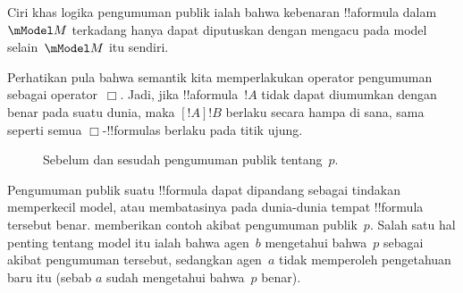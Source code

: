 \documentclass[../../../include/open-logic-section]{subfiles}
\begin{document}
Ciri khas logika pengumuman publik ialah bahwa kebenaran !!a{formula}
dalam~$\mModel M$ terkadang hanya dapat diputuskan dengan mengacu pada model
selain~$\mModel M$ itu sendiri.

Perhatikan pula bahwa semantik kita memperlakukan operator pengumuman sebagai
operator~$\Box$. Jadi, jika !!a{formula}~$!A$ tidak dapat diumumkan dengan
benar pada suatu dunia, maka $[!A]!B$ berlaku secara hampa di sana, sama
seperti semua $\Box$-!!{formula}s berlaku pada titik ujung.

\begin{figure}
  \begin{center}
  \end{center}
  \caption{Sebelum dan sesudah pengumuman publik tentang~$p$.}
\end{figure}

Pengumuman publik suatu !!{formula} dapat dipandang sebagai tindakan
memperkecil model, atau membatasinya pada dunia-dunia tempat !!{formula}
tersebut benar.  memberikan contoh akibat
pengumuman publik~$p$. Salah satu hal penting tentang model itu ialah bahwa
agen~$b$ mengetahui bahwa~$p$ sebagai akibat pengumuman tersebut, sedangkan
agen~$a$ tidak memperoleh pengetahuan baru itu (sebab $a$ sudah mengetahui
bahwa~$p$ benar).
\end{document}

